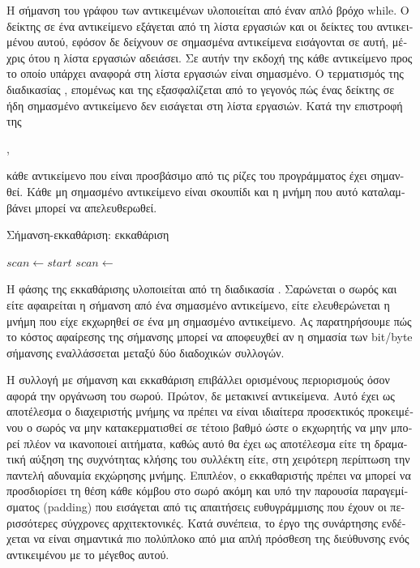 \begin{greek}
Η σήμανση του γράφου των αντικειμένων υλοποιείται από έναν 
απλό βρόχο while. Ο δείκτης σε ένα αντικείμενο εξάγεται από 
τη λίστα εργασιών και οι δείκτες του αντικειμένου αυτού, 
εφόσον δε δείχνουν σε σημασμένα αντικείμενα εισάγονται σε 
αυτή, μέχρις ότου η λίστα εργασιών αδειάσει. Σε αυτήν την
εκδοχή της  κάθε αντικείμενο προς το οποίο
υπάρχει αναφορά στη λίστα εργασιών είναι σημασμένο. 
Ο τερματισμός της διαδικασίας , επομένως και 
της  εξασφαλίζεται από το γεγονός 
πώς ένας δείκτης σε ήδη σημασμένο αντικείμενο δεν εισάγεται 
στη λίστα εργασιών. Κατά την επιστροφή της \end{greek} , \begin{greek} 
κάθε αντικείμενο που είναι προσβάσιμο από τις ρίζες του 
προγράμματος έχει σημανθεί. Κάθε μη σημασμένο αντικείμενο 
είναι σκουπίδι και η μνήμη που αυτό καταλαμβάνει μπορεί να 
απελευθερωθεί.

\begin{algorithm}
  \caption{Σήμανση-εκκαθάριση: εκκαθάριση}
  \label{alg:mrkswp_3}
  \begin{algorithmic}[1]
      \State $scan \gets start$
          \State {}
        \Else
          \State {}
        \EndIf
        \State $scan \gets$ 
      \EndWhile
    \EndProcedure
  \end{algorithmic}
\end{algorithm}

Η φάσης της εκκαθάρισης υλοποιείται από τη διαδικασία 
. Σαρώνεται ο σωρός και είτε αφαιρείται η 
σήμανση από ένα σημασμένο αντικείμενο, είτε ελευθερώνεται η 
μνήμη που είχε εκχωρηθεί σε ένα μη σημασμένο αντικείμενο.
Ας παρατηρήσουμε πώς το κόστος αφαίρεσης της σήμανσης μπορεί 
να αποφευχθεί αν η σημασία των bit/byte σήμανσης εναλλάσσεται 
μεταξύ δύο διαδοχικών συλλογών.

Η συλλογή με σήμανση και εκκαθάριση επιβάλλει ορισμένους
περιορισμούς όσον αφορά την οργάνωση του σωρού. Πρώτον, δε
μετακινεί αντικείμενα. Αυτό έχει ως αποτέλεσμα ο διαχειριστής
μνήμης να πρέπει να είναι ιδιαίτερα προσεκτικός προκειμένου ο
σωρός να μην κατακερματισθεί σε τέτοιο βαθμό ώστε ο εκχωρητής
να μην μπορεί πλέον να ικανοποιεί αιτήματα, καθώς αυτό θα έχει
ως αποτέλεσμα είτε τη δραματική αύξηση της συχνότητας κλήσης
του συλλέκτη είτε, στη χειρότερη περίπτωση την παντελή 
αδυναμία εκχώρησης μνήμης. Επιπλέον, ο εκκαθαριστής πρέπει
να μπορεί να προσδιορίσει τη θέση κάθε κόμβου στο σωρό ακόμη
και υπό την παρουσία παραγεμίσματος (padding) που εισάγεται
από τις απαιτήσεις ευθυγράμμισης που έχουν οι περισσότερες
σύγχρονες αρχιτεκτονικές. Κατά συνέπεια, το έργο της 
συνάρτησης  ενδέχεται να είναι σημαντικά
πιο πολύπλοκο από μια απλή πρόσθεση της διεύθυνσης ενός
αντικειμένου με το μέγεθος αυτού.


\end{greek}
